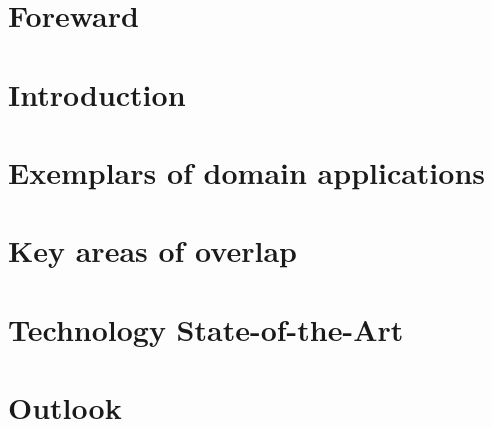 \documentclass[utf8]{frontiersFPHY}
\begin{document}
\clearpage
\begin{spacing}{1.3}
\makeatletter
  \null\hfill\textbf{\Large\contentsname}\hfill\null\par
  \@mkboth{\MakeUppercase\contentsname}{\MakeUppercase\contentsname}%
\makeatother
\end{spacing}

\clearpage

\begin{spacing}{1.3}
\section*{Foreward}


\pagebreak
\section{Introduction}


\pagebreak
\section{Exemplars of domain applications}
\label{sec:apps}


\pagebreak
\section{Key areas of overlap}
\label{sec:overlaps}


\pagebreak
\section{Technology State-of-the-Art}
\label{sec:technolog_sota}


\pagebreak
\section{Outlook}
\label{sec:outlook}




\end{spacing}
\end{document}
